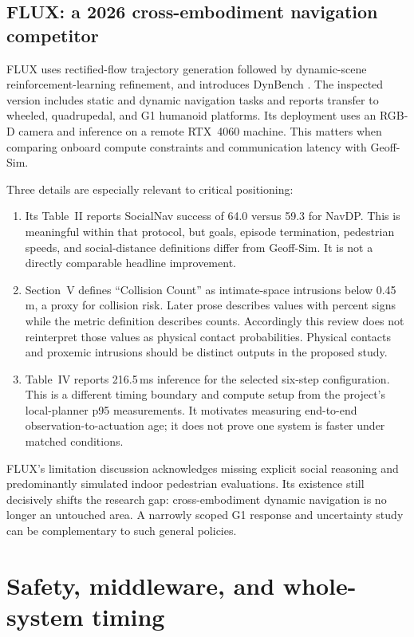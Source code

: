 \documentclass[11pt,a4paper]{article}
\begin{document}
\subsection{FLUX: a 2026 cross-embodiment navigation competitor}
FLUX uses rectified-flow trajectory generation followed by dynamic-scene
reinforcement-learning refinement, and introduces DynBench \citep{flux}.
The inspected version includes static and dynamic navigation tasks and
reports transfer to wheeled, quadrupedal, and G1 humanoid platforms. Its
deployment uses an RGB-D camera and inference on a remote RTX~4060 machine.
This matters when comparing onboard compute constraints and communication
latency with Geoff-Sim.

Three details are especially relevant to critical positioning:
\begin{enumerate}
\item Its Table~II reports SocialNav success of 64.0 versus 59.3 for NavDP.
This is meaningful within that protocol, but goals, episode termination,
pedestrian speeds, and social-distance definitions differ from Geoff-Sim.
It is not a directly comparable headline improvement.
\item Section~V defines ``Collision Count'' as intimate-space intrusions
below 0.45\,m, a proxy for collision risk. Later prose describes values
with percent signs while the metric definition describes counts.
Accordingly this review does not reinterpret those values as physical
contact probabilities. Physical contacts and proxemic intrusions should
be distinct outputs in the proposed study.
\item Table~IV reports 216.5\,ms inference for the selected six-step
configuration. This is a different timing boundary and compute setup from
the project's local-planner p95 measurements. It motivates measuring
end-to-end observation-to-actuation age; it does not prove one system
is faster under matched conditions.
\end{enumerate}

FLUX's limitation discussion acknowledges missing explicit social reasoning
and predominantly simulated indoor pedestrian evaluations. Its existence
still decisively shifts the research gap: cross-embodiment dynamic
navigation is no longer an untouched area. A narrowly scoped G1 response
and uncertainty study can be complementary to such general policies.

\section{Safety, middleware, and whole-system timing}
\label{sec:safety}
\end{document}
